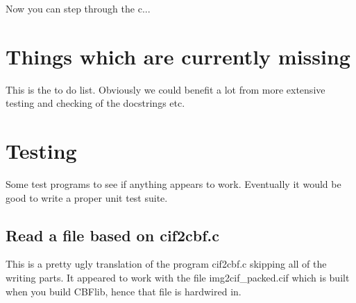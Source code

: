 \documentclass[10pt,a4paper,twoside,notitlepage]{article}
\begin{document}
Now you can step through the c...

\section{Things which are currently missing}

This is the to do list. Obviously we could benefit a lot from more
extensive testing and checking of the docstrings etc.



\section{Testing}

Some test programs to see if anything appears to work. Eventually
it would be good to write a proper unit test suite.

\subsection{Read a file based on cif2cbf.c}

This is a pretty ugly translation of the program cif2cbf.c skipping
all of the writing parts. 
It appeared to work with the file img2cif\_packed.cif which is built
when you build CBFlib, hence that file is hardwired in.
\end{document}
